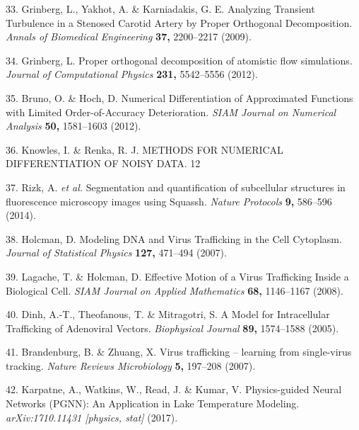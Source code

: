 \documentclass[12pt,a4paper,]{Dissertate}
\begin{document}
\leavevmode\hypertarget{ref-grinberg_analyzing_2009}{}%
33. Grinberg, L., Yakhot, A. \& Karniadakis, G. E. Analyzing Transient
Turbulence in a Stenosed Carotid Artery by Proper Orthogonal
Decomposition. \emph{Annals of Biomedical Engineering} \textbf{37,}
2200--2217 (2009).

\leavevmode\hypertarget{ref-grinberg_proper_2012}{}%
34. Grinberg, L. Proper orthogonal decomposition of atomistic flow
simulations. \emph{Journal of Computational Physics} \textbf{231,}
5542--5556 (2012).

\leavevmode\hypertarget{ref-bruno_numerical_2012}{}%
35. Bruno, O. \& Hoch, D. Numerical Differentiation of Approximated
Functions with Limited Order-of-Accuracy Deterioration. \emph{SIAM
Journal on Numerical Analysis} \textbf{50,} 1581--1603 (2012).

\leavevmode\hypertarget{ref-knowles_methods_nodate}{}%
36. Knowles, I. \& Renka, R. J. METHODS FOR NUMERICAL DIFFERENTIATION OF
NOISY DATA. 12

\leavevmode\hypertarget{ref-rizk_segmentation_2014}{}%
37. Rizk, A. \emph{et al.} Segmentation and quantification of
subcellular structures in fluorescence microscopy images using Squassh.
\emph{Nature Protocols} \textbf{9,} 586--596 (2014).

\leavevmode\hypertarget{ref-holcman_modeling_2007}{}%
38. Holcman, D. Modeling DNA and Virus Trafficking in the Cell
Cytoplasm. \emph{Journal of Statistical Physics} \textbf{127,} 471--494
(2007).

\leavevmode\hypertarget{ref-lagache_effective_2008}{}%
39. Lagache, T. \& Holcman, D. Effective Motion of a Virus Trafficking
Inside a Biological Cell. \emph{SIAM Journal on Applied Mathematics}
\textbf{68,} 1146--1167 (2008).

\leavevmode\hypertarget{ref-dinh_model_2005}{}%
40. Dinh, A.-T., Theofanous, T. \& Mitragotri, S. A Model for
Intracellular Trafficking of Adenoviral Vectors. \emph{Biophysical
Journal} \textbf{89,} 1574--1588 (2005).

\leavevmode\hypertarget{ref-brandenburg_virus_2007}{}%
41. Brandenburg, B. \& Zhuang, X. Virus trafficking -- learning from
single-virus tracking. \emph{Nature Reviews Microbiology} \textbf{5,}
197--208 (2007).

\leavevmode\hypertarget{ref-karpatne_physics-guided_2017}{}%
42. Karpatne, A., Watkins, W., Read, J. \& Kumar, V. Physics-guided
Neural Networks (PGNN): An Application in Lake Temperature Modeling.
\emph{arXiv:1710.11431 {[}physics, stat{]}} (2017).
\end{document}

